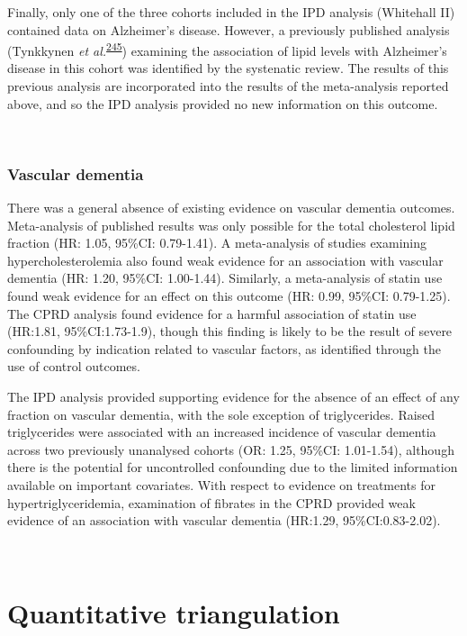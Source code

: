 \documentclass[a4paper, twoside]{templates/ociamthesis}
\begin{document}
Finally, only one of the three cohorts included in the IPD analysis (Whitehall II) contained data on Alzheimer's disease. However, a previously published analysis (Tynkkynen \emph{et al.}\textsuperscript{\protect\hyperlink{ref-tynkkynen2018}{245}}) examining the association of lipid levels with Alzheimer's disease in this cohort was identified by the systenatic review. The results of this previous analysis are incorporated into the results of the meta-analysis reported above, and so the IPD analysis provided no new information on this outcome.

~

\hypertarget{vascular-dementia}{%
\subsubsection{Vascular dementia}\label{vascular-dementia}}

There was a general absence of existing evidence on vascular dementia outcomes. Meta-analysis of published results was only possible for the total cholesterol lipid fraction (HR: 1.05, 95\%CI: 0.79-1.41). A meta-analysis of studies examining hypercholesterolemia also found weak evidence for an association with vascular dementia (HR: 1.20, 95\%CI: 1.00-1.44). Similarly, a meta-analysis of statin use found weak evidence for an effect on this outcome (HR: 0.99, 95\%CI: 0.79-1.25). The CPRD analysis found evidence for a harmful association of statin use (HR:1.81, 95\%CI:1.73-1.9), though this finding is likely to be the result of severe confounding by indication related to vascular factors, as identified through the use of control outcomes.

The IPD analysis provided supporting evidence for the absence of an effect of any fraction on vascular dementia, with the sole exception of triglycerides. Raised triglycerides were associated with an increased incidence of vascular dementia across two previously unanalysed cohorts (OR: 1.25, 95\%CI: 1.01-1.54), although there is the potential for uncontrolled confounding due to the limited information available on important covariates. With respect to evidence on treatments for hypertriglyceridemia, examination of fibrates in the CPRD provided weak evidence of an association with vascular dementia (HR:1.29, 95\%CI:0.83-2.02).

~

\hypertarget{quantitative-triangulation}{%
\section{Quantitative triangulation}\label{quantitative-triangulation}}
\end{document}
